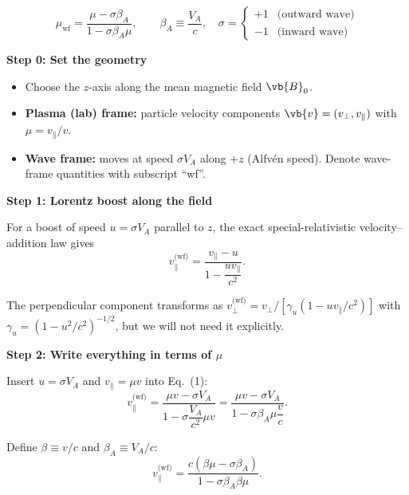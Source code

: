 \begin{tcolorbox}[colback=white, colframe=black, title={Detailed Derivation of the Pitch–Angle Cosine in the \textbf{Wave Frame}}]

\[
\boxed{
\mu_{\text{wf}} = \frac{\mu - \sigma \beta_A}{1 - \sigma \beta_A \mu}
},
\qquad
\beta_A \equiv \frac{V_A}{c}, \quad
\sigma = 
\begin{cases}
+1 & \text{(outward wave)} \\ 
-1 & \text{(inward wave)}
\end{cases}
\]

\medskip

\textbf{Step 0: Set the geometry}

\begin{itemize}
\item Choose the $z$-axis along the mean magnetic field $\vb{B}_0$.
\item \textbf{Plasma (lab) frame:} particle velocity components $\vb{v} = (v_\perp, v_\parallel)$ with $\mu = v_\parallel / v$.
\item \textbf{Wave frame:} moves at speed $\sigma V_A$ along $+z$ (Alfvén speed). Denote wave-frame quantities with subscript ``wf''.
\end{itemize}

\medskip

\textbf{Step 1: Lorentz boost along the field}

For a boost of speed $u = \sigma V_A$ parallel to $z$, the exact special-relativistic velocity–addition law gives
\begin{equation}
v_\parallel^{\text{(wf)}} = \frac{v_\parallel - u}{1 - \dfrac{u v_\parallel}{c^2}}.
\tag{1}
\end{equation}

The perpendicular component transforms as $v_\perp^{\text{(wf)}} = v_\perp / [\gamma_u (1 - uv_\parallel/c^2)]$ with $\gamma_u = (1 - u^2/c^2)^{-1/2}$, but we will not need it explicitly.

\medskip

\textbf{Step 2: Write everything in terms of $\mu$}

Insert $u = \sigma V_A$ and $v_\parallel = \mu v$ into Eq.~(1):
\begin{equation}
v_\parallel^{\text{(wf)}} 
= \frac{\mu v - \sigma V_A}{1 - \sigma \dfrac{V_A}{c^2} \mu v}
= \frac{\mu v - \sigma V_A}{1 - \sigma \beta_A \mu \dfrac{v}{c}}.
\tag{2}
\end{equation}

Define $\beta \equiv v/c$ and $\beta_A \equiv V_A/c$:
\begin{equation}
v_\parallel^{\text{(wf)}}
= \frac{c(\beta \mu - \sigma \beta_A)}{1 - \sigma \beta_A \beta \mu}.
\tag{3}
\end{equation}


\end{tcolorbox}
